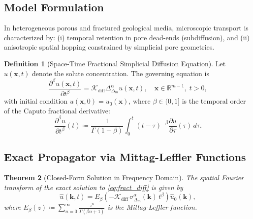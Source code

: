 \documentclass[11pt,a4paper]{article}
\theoremstyle{plain}
\newtheorem{theorem}{Theorem}[section]
\theoremstyle{definition}
\newtheorem{definition}[theorem]{Definition}
\theoremstyle{remark}
\numberwithin{equation}{section}
\begin{document}
\subsection{Model Formulation}

In heterogeneous porous and fractured geological media, microscopic transport is characterized by: (i) temporal retention in pore dead-ends (subdiffusion), and (ii) anisotropic spatial hopping constrained by simplicial pore geometries.

\begin{definition}[Space-Time Fractional Simplicial Diffusion Equation]
Let $u(\mathbf{x}, t)$ denote the solute concentration. The governing equation is
\begin{equation}
\label{eq:fract_diff}
\frac{\partial^\beta u(\mathbf{x}, t)}{\partial t^\beta} = \mathcal{K}_{\text{diff}} \Delta_{\Delta_m}^\alpha u(\mathbf{x}, t), \quad \mathbf{x} \in \mathbb{R}^{m-1}, \; t > 0,
\end{equation}
with initial condition $u(\mathbf{x}, 0) = u_0(\mathbf{x})$, where $\beta \in (0, 1]$ is the temporal order of the Caputo fractional derivative:
\begin{equation}
\frac{\partial^\beta u}{\partial t^\beta}(t) \coloneqq \frac{1}{\Gamma(1-\beta)}\int_0^t (t-\tau)^{-\beta} \frac{\partial u}{\partial \tau}(\tau) \, d\tau.
\end{equation}
\end{definition}

\subsection{Exact Propagator via Mittag-Leffler Functions}

\begin{theorem}[Closed-Form Solution in Frequency Domain]
The spatial Fourier transform of the exact solution to \eqref{eq:fract_diff} is given by
\begin{equation}
\widehat{u}(\mathbf{k}, t) = E_\beta\left(-\mathcal{K}_{\text{diff}}\,\sigma_{\Delta_m}^\alpha(\mathbf{k})\,t^\beta\right) \widehat{u}_0(\mathbf{k}),
\end{equation}
where $E_\beta(z) \coloneqq \sum_{n=0}^\infty \frac{z^n}{\Gamma(\beta n + 1)}$ is the Mittag-Leffler function.
\end{theorem}
\end{document}
